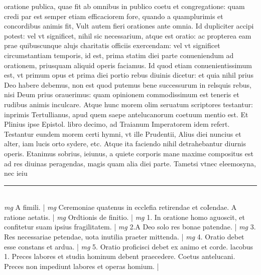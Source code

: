 \documentclass{article}
\begin{document}
\begin{pages}
oratione publica, quae fit ab omnibus in publico coetu et congregatione: quam credi par est semper etiam efficaciorem fore, quando a quamplurimis et concordibus animis fit, Vult autem fieri orationes ante omnia. Id dupliciter accipi potest: vel vt significet, nihil sic necessarium, atque est oratio: ac propterea eam prae quibuscunque  alujs charitatis officiis exercendam: vel vt significet circumstantiam temporis, id est, prima statim diei parte conueniendum ad orationem, priusquam aliquid operis faciamus. Id quod etiam conuenientissimum est, vt primum opus et prima diei portio rebus diuinis dicetur: et quia nihil prius Deo habere debemus, non est quod putemus bene successurum in relsquis rebus, nisi Deum prius orauerimus: quam opinionem commodissimum est teneris et rudibus animis inculcare. Atque hunc morem olim seruatum scriptores testantur: inprimis Tertullianus, apud quem saepe antelucanorum coetuum mentio est. Et Plinius ipse Epistol. libro decimo, ad Traianum Imperatorem idem refert. Testantur eundem morem certi hymni, vt ille Prudentii, Alius diei nuncius et alter, iam lucis orto sydere, etc. Atque ita faciendo nihil detrahebantur diurnis operis. Etanimus sobrius, ieiunus, a quiete corporis mane maxime compositus est ad res diuinas peragendas, magis quam alia diei parte. Tametsi vtnec eleemosyna, nec ieiu\pend
\vspace{0.5cm}\noindent
\vspace{0.2cm}\rule{1cm}{0.2pt}\\ 
\hspace{0.2cm}\textit{mg}
\footnotesize A fimili. 
\normalsize| 
\hspace{0.2cm}\textit{mg}
\footnotesize Ceremoniae quatenus in ecclefia retirendae et coIendae. A ratione aetatis. 
\normalsize| 
\hspace{0.2cm}\textit{mg}
\footnotesize Ordtionis de finitio. 
\normalsize| 
\hspace{0.2cm}\textit{mg}
\footnotesize 1. In oratione homo aguoscit, et confitetur suam ipsius fragilitatem. 
\normalsize| 
\hspace{0.2cm}\textit{mg}
\footnotesize 2.A Deo solo res bonae patendae. 
\normalsize| 
\hspace{0.2cm}\textit{mg}
\footnotesize 3. Res necessariae petendae, uota inutilia praeter mittenda. 
\normalsize| 
\hspace{0.2cm}\textit{mg}
\footnotesize 4. Oratio debet esse constans et ardua. 
\normalsize| 
\hspace{0.2cm}\textit{mg}
\footnotesize 5. Oratio proficisci debet ex animo et corde. lacobus  1. Preces labores et studia hominum debent praecedere. Coetus antelucani. Preces non impediunt labores et operas homium. 
\normalsize| 

\end{pages}
\end{document}
